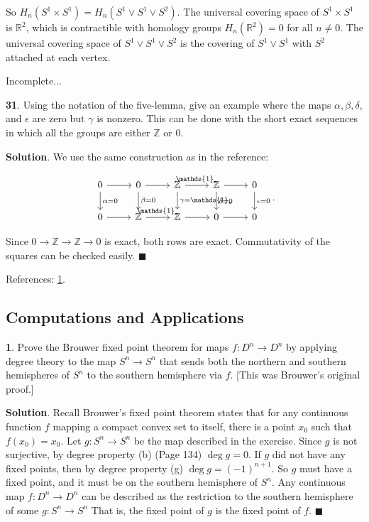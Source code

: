 \documentclass{article}
\newcommand{\R}{\mathbb{R}}
\newcommand{\Z}{\mathbb{Z}}
\newcommand{\identity}{\mathds{1}}
\begin{document}
So $H_{n}(S^{1}\times S^{1}) = H_{n}(S^{1}\vee S^{1}\vee S^{2})$. The universal covering space of $S^{1}\times S^{1}$ is $\R^{2}$, which is contractible with homology groups $H_{n}(\R^{2}) = 0$ for all $n\neq 0$. The universal covering space of $S^{1}\vee S^{1}\vee S^{2}$ is the covering of $S^{1}\vee S^{1}$ with $S^{2}$ attached at each vertex.
\medskip

Incomplete...
\bigskip
\bigskip

\textbf{31}. Using the notation of the five-lemma, give an example where the maps $\alpha, \beta, \delta$, and $\epsilon$ are zero but $\gamma$ is nonzero. This can be done with the short exact sequences in which all the groups are either $\Z$ or 0.
\medskip

\textbf{Solution}. We use the same construction as in the reference:

\[\begin{tikzcd}
0 \arrow{r}\arrow{d}{\alpha = 0} & 0 \arrow{r}\arrow{d}{\beta = 0} & \Z \arrow{r}{\identity_{\ast}}\arrow{d}{\gamma = \identity_{\ast}} & \Z \arrow{r}\arrow{d}{\delta = 0} & 0 \arrow{d}{\epsilon = 0}\\
0 \arrow{r} & \Z \arrow{r}{\identity_{\ast}} & \Z \arrow{r} & 0 \arrow{r} & 0
\end{tikzcd}.\]
\medskip

Since $0\to \Z\to \Z\to 0$ is exact, both rows are exact. Commutativity of the squares can be checked easily. $\blacksquare$
\medskip

References: \href{https://cemulate.github.io/solutions_hatcher/e2-1-31.html}{1}.
\bigskip
\bigskip

\subsection{Computations and Applications}

\tab\textbf{1}. Prove the Brouwer fixed point theorem for maps $f:D^{n}\to D^{n}$ by applying degree theory to the map $S^{n}\to S^{n}$ that sends both the northern and southern hemispheres of $S^{n}$ to the southern hemisphere via $f$. [This was Brouwer's original proof.]
\medskip

\textbf{Solution}. Recall Brouwer's fixed point theorem states that for any continuous function $f$ mapping a compact convex set to itself, there is a point $x_{0}$ such that $f(x_{0}) = x_{0}$. Let $g: S^{n}\to S^{n}$ be the map described in the exercise. Since $g$ is not surjective, by degree property (b) (Page 134) $\deg g = 0$. If $g$ did not have any fixed points, then by degree property (g) $\deg g = (-1)^{n+1}$. So $g$ must have a fixed point, and it must be on the southern hemisphere of $S^{n}$. Any continuous map $f:D^{n}\to D^{n}$ can be described as the restriction to the southern hemisphere of some $g: S^{n}\to S^{n}$  That is, the fixed point of $g$ is the fixed point of $f$. $\blacksquare$
\medskip
\end{document}
